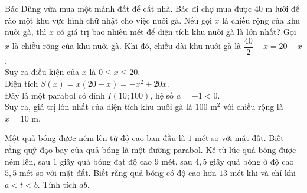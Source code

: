 \begin{bt}%
	Bác Dũng vừa mua một mảnh đất để cất nhà. Bác đi chợ mua được $40$ m lưới để rào một khu vực hình chữ nhật cho việc nuôi gà. Nếu gọi $x$ là chiều rộng của khu nuôi gà, thì $x$ có giá trị bao nhiêu mét để diện tích khu nuôi gà là lớn nhất?
	\loigiai
	{
		Gọi $x$ là chiều rộng của khu nuôi gà. Khi đó, chiều dài khu nuôi gà là $\dfrac{40}{2}-x = 20 - x$.\\
		Suy ra điều kiện của $x$ là $0 \le x \le 20$.\\
		Diện tích $S(x) = x(20-x) = -x^2 + 20x$.\\
		Đây là một parabol có đỉnh $I(10; 100)$, hệ số $a=-1<0$. \\
		Suy ra, giá trị lớn nhất của diện tích khu nuôi gà là $100$ m$^2$ với chiều rộng là $x=10$ m.
	}
\end{bt}

\begin{bt}%
	Một quả bóng được ném lên từ độ cao ban đầu là $ 1 $ mét so với mặt đất. Biết rằng quỹ đạo bay của quả bóng là một đường parabol. Kể từ lúc quả bóng được ném lên, sau $ 1 $ giây quả bóng đạt độ cao $ 9 $ mét, sau $ 4{,}5 $ giây quả bóng ở độ cao $ 5{,}5 $ mét so với mặt đất. Biết rằng quả bóng có độ cao hơn $13$ mét khi và chỉ khi $a<t<b$. Tính tích $ab$.
\end{bt}

